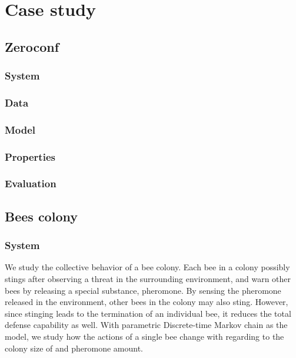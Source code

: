 \chapter{Case study}
\section{Zeroconf}
\subsection{System}
\subsection{Data}
\subsection{Model}
\subsection{Properties}
\subsection{Evaluation}

\section{Bees colony}
\subsection{System}
We study the collective behavior of a bee colony. Each bee in a colony
possibly stings after observing a threat in the surrounding environment, and
warn other bees by releasing a special substance, pheromone. By sensing the
pheromone released in the environment, other bees in the colony may also
sting. However, since stinging leads to the termination of an individual bee,
it reduces the total defense capability as well. With parametric Discrete-time
Markov chain as the model, we study how the actions of a single bee change
with regarding to the colony size of and pheromone amount.

